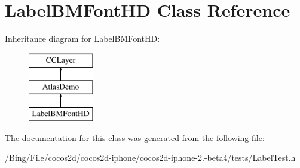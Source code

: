 \hypertarget{interface_label_b_m_font_h_d}{\section{Label\-B\-M\-Font\-H\-D Class Reference}
\label{interface_label_b_m_font_h_d}
}
Inheritance diagram for Label\-B\-M\-Font\-H\-D\-:\begin{figure}[H]
\begin{center}
\leavevmode
\includegraphics[height=3.000000cm]{interface_label_b_m_font_h_d}
\end{center}
\end{figure}


The documentation for this class was generated from the following file\-:\begin{DoxyCompactItemize}
\item 
/\-Bing/\-File/cocos2d/cocos2d-\/iphone/cocos2d-\/iphone-\/2.-\/beta4/tests/Label\-Test.\-h\end{DoxyCompactItemize}
